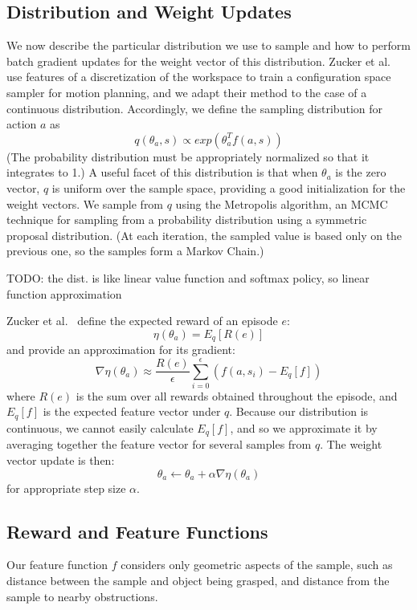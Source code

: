 \subsection{Distribution and Weight Updates}
We now describe the particular distribution we use to sample
and how to perform batch gradient updates for the weight vector of
this distribution. Zucker et al.~\cite{workspacebias} use features of a discretization of the workspace to train
a configuration space sampler for motion planning, and we adapt their
method to the case of a continuous distribution. Accordingly, we define the sampling distribution for
action $a$ as $$q(\theta_{a}, s) \propto exp(\theta_{a}^{T} f(a, s))$$
(The probability distribution must be appropriately normalized so
that it integrates to 1.) A useful facet of this distribution is
that when $\theta_{a}$ is the zero vector, $q$ is uniform over the
sample space, providing a good initialization for the weight
vectors. We sample from $q$ using the Metropolis algorithm,
an MCMC technique for sampling from a probability distribution using
a symmetric proposal distribution. (At each iteration, the sampled value
is based only on the previous one, so the samples form a Markov Chain.)

TODO: the dist. is like linear value function and softmax policy, so linear function approximation

Zucker et al.~\cite{workspacebias} define the expected reward of an episode $e$:
$$\eta(\theta_{a}) = E_{q}[R(e)]$$ and provide an approximation for its gradient:
$$\nabla \eta(\theta_{a}) \approx \frac{R(e)}{\epsilon} \sum_{i=0}^{\epsilon}(f(a, s_{i}) - E_{q}[f])$$
where $R(e)$ is the sum over all rewards obtained throughout the episode, and
$E_{q}[f]$ is the expected feature vector under $q$. Because our distribution
is continuous, we cannot easily calculate $E_{q}[f]$, and so we approximate it by averaging
together the feature vector for several samples from $q$. The weight vector update is then:
$$\theta_{a} \leftarrow \theta_{a} + \alpha \nabla \eta(\theta_{a})$$
for appropriate step size $\alpha$.

\subsection{Reward and Feature Functions}
Our feature function $f$ considers only geometric
aspects of the sample, such as distance between the sample and object being grasped, and distance from
the sample to nearby obstructions.
